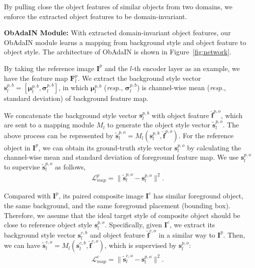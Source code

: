 \documentclass[letterpaper]{article} %
\begin{document}
By pulling close the object features of similar objects from two domains,  we enforce the extracted object features to be domain-invariant.

\textbf{ObAdaIN Module: }With extracted domain-invariant object features, our ObAdaIN module learns a mapping from background style and object feature to object style. The architecture of ObAdaIN is shown in Figure~\ref{fig:network}.

By taking the reference image $\bm{I}^p$ and the $l$-th encoder layer as an example, we have the feature map $\bm{F}^p_l$. We extract the background style vector $\bm{s}^{p,b}_l=[\bm{\mu}^{p,b}_l, \bm{\sigma}^{p,b}_l]$, in which $\bm{\mu}^{p,b}_l$ (\emph{resp.}, $\bm{\sigma}^{p,b}_l$) is channel-wise mean (\emph{resp.}, standard deviation) of background feature map.

We concatenate the background style vector $\bm{s}^{p,b}_l$ with object feature $\hat{\bm{f}}^{p,o}$, which are sent to a mapping module $M_l$ to generate the object style vector $\tilde{\bm{s}}^{p,o}_l$.
The above process can be represented by $\tilde{\bm{s}}^{p,o}_l=M_l(\bm{s}^{p,b}_l, \hat{\bm{f}}^{p,o})$.
For the reference object in  $\bm{I}^p$, we can obtain its ground-truth style vector $\bm{s}^{p,o}_l$ by calculating the channel-wise mean and standard deviation of foreground feature map. We use $\bm{s}^{p,o}_l$ to supervise $\tilde{\bm{s}}^{p,o}_l$ as follows,
\begin{eqnarray}
\mathcal{L}_{map}^p = \|\tilde{\bm{s}}^{p,o}_l-\bm{s}^{p,o}_l\|^2.
\end{eqnarray}

Compared with $\bm{I}^p$, its paired composite image $\bm{I}^c$ has similar foreground object, the same background, and the same foreground placement (bounding box). Therefore, we assume that the ideal target style of composite object should be close to reference object style $\bm{s}^{p,o}_l$.
Specifically, given $\bm{I}^c$, we extract its background style vector $\bm{s}^{c,b}_l$ and object feature $\hat{\bm{f}}^{c,o}$ in a similar way to $\bm{I}^p$. Then, we can have $\tilde{\bm{s}}^{c,o}_l=M_l(\bm{s}^{c,b}_l, \hat{\bm{f}}^{c,o})$, which is supervised by $\bm{s}^{p,o}_l$:
\begin{eqnarray}
\mathcal{L}_{map}^c = \|\tilde{\bm{s}}^{c,o}_l-\bm{s}^{p,o}_l\|^2.
\end{eqnarray}
\end{document}
